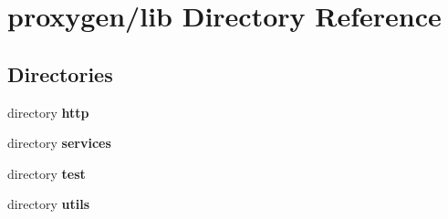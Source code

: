 \section{proxygen/lib Directory Reference}
\label{dir_baa8b6fadb61b56c035914fe171fd962}
\subsection*{Directories}
\begin{DoxyCompactItemize}
\item 
directory {\bf http}
\item 
directory {\bf services}
\item 
directory {\bf test}
\item 
directory {\bf utils}
\end{DoxyCompactItemize}
